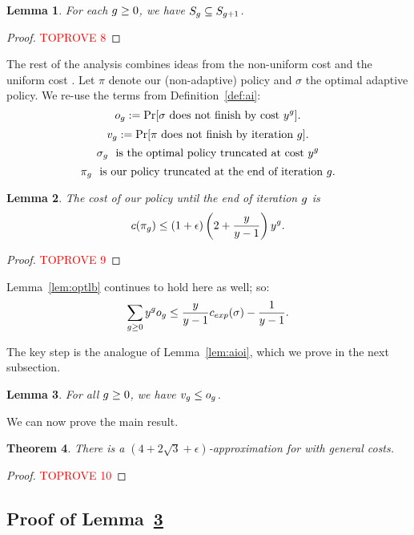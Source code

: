 \documentclass[11pt]{article}
\newcommand{\base}{y}
\newtheorem{thm}{Theorem}[section]
\newtheorem{lem}[thm]{Lemma}
\theoremstyle{remark}
\theoremstyle{plain}
\theoremstyle{remark}
\begin{document}
\begin{lem}\label{lem:smqi-nested}
    For each $g\ge 0$, we have $S_g \subseteq S_{g+1}$. 
\end{lem}
\begin{proof}\textcolor{red}{TOPROVE 8}\end{proof}

The rest of the analysis combines ideas from the non-uniform cost \smq and the uniform cost \smqi. Let $\pi$ denote our (non-adaptive) policy and $\sigma$ the optimal adaptive policy. We re-use the terms from Definition~\ref{def:ai}: 
  \[ o_\i := \Pr[ \sigma \text{ does not finish by cost }\base^\i] . \]
    \[ v_g := \Pr[\pi \text{ does not finish by iteration }g] .\]
    \[\sigma_\i \,\,  \text{ is the optimal policy truncated at cost }\base^\i\]
    \[\pi_g \,\,  \text{ is our policy truncated at the end of iteration  } g.\]

    
\begin{lem}
\label{lem:smqi-cost-i}The cost of our policy until the end of iteration $g$  is
   \[c(\pi_\i)  \leq (1 + \epsilon) \left(2 + \dfrac{\base}{\base - 1}  \right)\base^\i. \]
\end{lem}
\begin{proof}\textcolor{red}{TOPROVE 9}\end{proof}
Lemma~\ref{lem:optlb} continues to hold here as well; so:
\begin{equation}
    \label{eq:lem-opt-lb}
    \sum_{\i\ge 0} {\base^\i o_\i} \leq  \frac{\base }{\base-1} c_{exp}(\sigma) - \frac1{y-1}. 
\end{equation}

The key step is the analogue of Lemma~\ref{lem:aioi}, which we prove in the next subsection.
 \begin{lem} For all $g \ge 0$, we have $v_g \le o_g$. 
 \label{lem:smqi-comp-prob}
 \end{lem}

We can now prove the main result. 
\begin{thm}
      There is a $( 4+ 2\sqrt{3} + \epsilon)$-approximation for \smqi  with general costs.  

\end{thm}
\begin{proof}\textcolor{red}{TOPROVE 10}\end{proof}




\subsection{Proof of Lemma~\ref{lem:smqi-comp-prob}}
\end{document}

